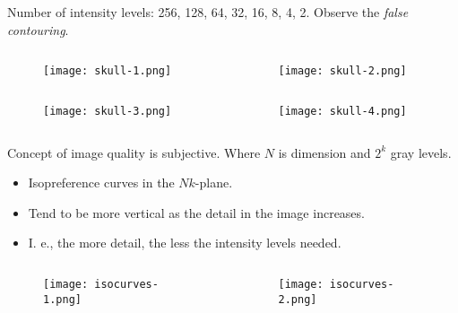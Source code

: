 \begin{frame}
Number of intensity levels: 256, 128, 64, 32, 16, 8, 4, 2. Observe the \textit{false contouring}.
\begin{columns}
\begin{column}{.5\textwidth}
\begin{figure}
\texttt{[image: skull-1.png]}
\end{figure}
\end{column}
\begin{column}{.5\textwidth}
\begin{figure}
\texttt{[image: skull-2.png]}
\end{figure}
\end{column}
\end{columns}
\begin{columns}
\begin{column}{.5\textwidth}
\begin{figure}
\texttt{[image: skull-3.png]}
\end{figure}
\end{column}
\begin{column}{.5\textwidth}
\begin{figure}
\texttt{[image: skull-4.png]}
\end{figure}
\end{column}
\end{columns}
\end{frame}


\begin{frame}
Concept of image quality is subjective. Where $N$ is dimension and $2^k$ gray levels.
\begin{itemize}
\item Isopreference curves in the $Nk$-plane.
\item Tend to be more vertical as the detail in the image increases.
\item I. e., the more detail, the less the intensity levels needed.
\end{itemize}
\begin{columns}
\begin{column}{.7\textwidth}
\begin{figure}
\texttt{[image: isocurves-1.png]}
\end{figure}
\end{column}
\begin{column}{.3\textwidth}
\begin{figure}
\texttt{[image: isocurves-2.png]}
\end{figure}
\end{column}
\end{columns}
\end{frame}

